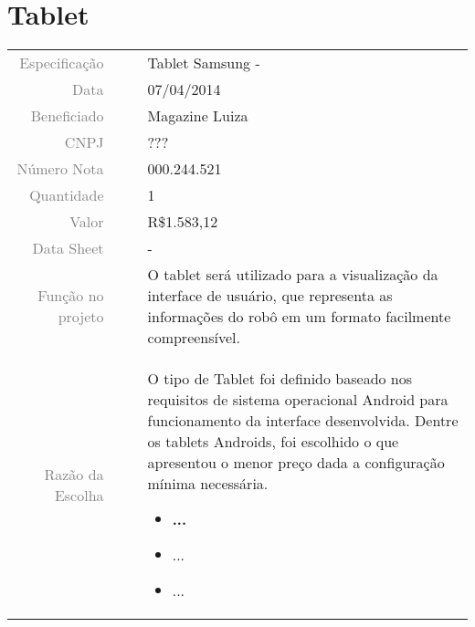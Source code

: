 

\section{Tablet}
\label{tablet}


\begin{table}[ht!]

	\begin{tabular}{r l|l p{12cm} }
		
		\textcolor{gray}{Especificação} &&& 	{Tablet Samsung - }\\
		\textcolor{gray}{Data} &&& 				{07/04/2014}\\
        \textcolor{gray}{Beneficiado} &&&		{Magazine Luiza} \\
        \textcolor{gray}{CNPJ} &&& 				{???} \\
        \textcolor{gray}{Número Nota} &&& 		{000.244.521} \\
		\textcolor{gray}{Quantidade} &&& 		{1} \\
		\textcolor{gray}{Valor} &&& 			{R\$1.583,12} \\
		\textcolor{gray}{Data Sheet} &&& 		{-} \\

		\textcolor{gray}{Função no projeto} &&& {O tablet será utilizado para a visualização da interface de usuário, que representa as informações do robô em um formato facilmente compreensível.} \\
		\textcolor{gray}{Razão da Escolha} &&& {O tipo de Tablet foi definido baseado nos requisitos de sistema operacional Android para funcionamento da interface desenvolvida. Dentre os tablets Androids, foi escolhido o que apresentou o menor preço dada a configuração mínima necessária.  

		\begin{itemize}
		  \item \textbf{...} 
		  \item ...
		  \item ...
		\end{itemize}}
		

	\end{tabular}
\end{table}

